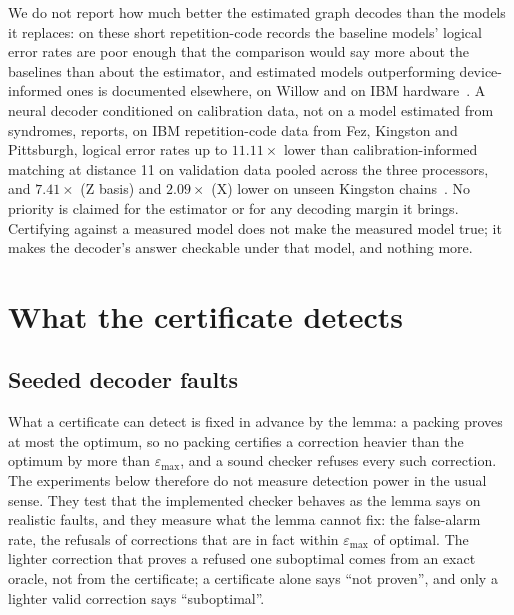 \documentclass[aps,pra,twocolumn,superscriptaddress,nofootinbib,longbibliography,floatfix]{revtex4-2}
\newcommand{\eps}{\varepsilon}
\begin{document}
We do not report how much better the estimated graph decodes than the models it replaces: on these short repetition-code records the baseline models' logical error rates are poor enough that the comparison would say more about the baselines than about the estimator, and estimated models outperforming device-informed ones is documented elsewhere, on Willow and on IBM hardware~\cite{takou2026logical}. A neural decoder conditioned on calibration data, not on a model estimated from syndromes, reports, on IBM repetition-code data from Fez, Kingston and Pittsburgh, logical error rates up to $11.11\times$ lower than calibration-informed matching at distance 11 on validation data pooled across the three processors, and $7.41\times$ (Z basis) and $2.09\times$ (X) lower on unseen Kingston chains~\cite{stein2026calibration}. No priority is claimed for the estimator or for any decoding margin it brings. Certifying against a measured model does not make the measured model true; it makes the decoder's answer checkable under that model, and nothing more.

\section{What the certificate detects}
\label{sec:detection}

\subsection{Seeded decoder faults}

What a certificate can detect is fixed in advance by the lemma: a packing proves at most the optimum, so no packing certifies a correction heavier than the optimum by more than $\eps_{\max}$, and a sound checker refuses every such correction. The experiments below therefore do not measure detection power in the usual sense. They test that the implemented checker behaves as the lemma says on realistic faults, and they measure what the lemma cannot fix: the false-alarm rate, the refusals of corrections that are in fact within $\eps_{\max}$ of optimal. The lighter correction that proves a refused one suboptimal comes from an exact oracle, not from the certificate; a certificate alone says ``not proven'', and only a lighter valid correction says ``suboptimal''.
\end{document}
